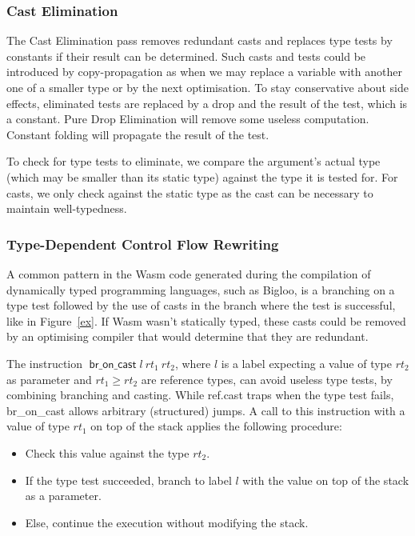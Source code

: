 \documentclass[a4paper,11pt]{article}
\DeclareMathOperator{\broncast}{\textsf{br\_on\_cast}}
\begin{document}
\subsubsection{Cast Elimination}
The Cast Elimination pass removes redundant casts and replaces type tests by
constants if their result can be determined. Such casts and tests could be
introduced by copy-propagation as when we may replace a variable with another
one of a smaller type or by the next optimisation. To stay conservative about
side effects, eliminated tests are replaced by a \textsf{drop} and the result of
the test, which is a constant. Pure Drop Elimination will remove some useless
computation. Constant folding will propagate the result of the test.

To check for type tests to eliminate, we compare the argument's actual type
(which may be smaller than its static type) against the type it is tested for.
For casts, we only check against the static type as the cast can be necessary to
maintain well-typedness.

\subsubsection{Type-Dependent Control Flow Rewriting}
A common pattern in the Wasm code generated during the compilation of
dynamically typed programming languages, such as Bigloo, is a branching on a
type test followed by the use of casts in the branch where the test is
successful, like in Figure~\ref{ex}. If Wasm wasn't statically typed, these
casts could be removed by an optimising compiler that would determine that they
are redundant.

The instruction $\broncast l\ rt_1\ rt_2$, where $l$ is a label expecting a
value of type $rt_2$ as parameter and $rt_1\geq rt_2$ are reference types, can
avoid useless type tests, by combining branching and casting. While
\textsf{ref.cast} traps when the type test fails, \textsf{br\_on\_cast} allows
arbitrary (structured) jumps. A call to this instruction with a value of type
$rt_1$ on top of the stack applies the following procedure:
\begin{itemize}\setlength{\itemsep}{0pt}
  \item Check this value against the type $rt_2$.
  \item If the type test succeeded, branch to label $l$ with the value on top of
    the stack as a parameter.
  \item Else, continue the execution without modifying the stack.
\end{itemize}
\end{document}
